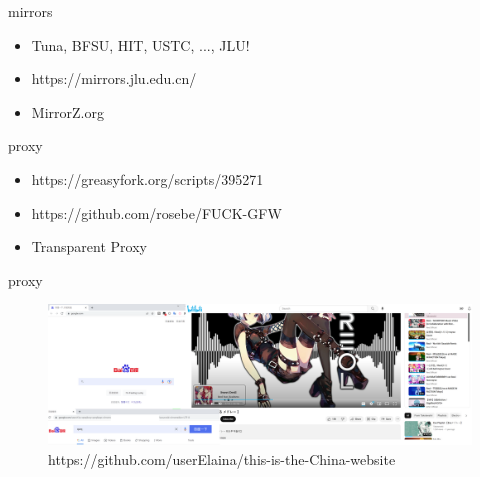 \documentclass{beamer}
\begin{document}
\begin{frame}{mirrors}
    \begin{itemize}
        \item Tuna, BFSU, HIT, USTC, ..., JLU!
        \item https://mirrors.jlu.edu.cn/
        \item MirrorZ.org
    \end{itemize}
\end{frame}


\begin{frame}{proxy}
    \begin{itemize}
        \item https://greasyfork.org/scripts/395271
        \item https://github.com/rosebe/FUCK-GFW
        \item Transparent Proxy
    \end{itemize}
\end{frame}

\begin{frame}{proxy}
    \begin{figure}[c]
        \centering
        \includegraphics[height=.5\textheight]{pic/gf.png}
        \caption{https://github.com/userElaina/this-is-the-China-website}
    \end{figure}
\end{frame}
\end{document}
